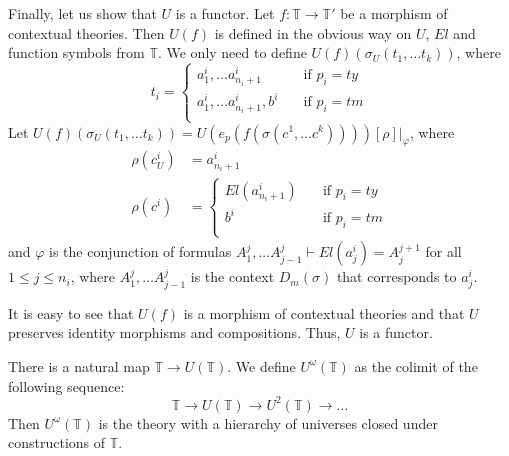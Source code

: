 \documentclass[reqno]{amsart}
\theoremstyle{definition}
\theoremstyle{remark}
\numberwithin{figure}{section}
\begin{document}
\begin{example}
Finally, let us show that $U$ is a functor.
Let $f : \mathbb{T} \to \mathbb{T}'$ be a morphism of contextual theories.
Then $U(f)$ is defined in the obvious way on $U$, $El$ and function symbols from $\mathbb{T}$.
We only need to define $U(f)(\sigma_U(t_1, \ldots t_k))$, where
\[ t_i =
  \begin{cases}
    a^i_1, \ldots a^i_{n_i+1}       & \quad \text{if } p_i = ty \\
    a^i_1, \ldots a^i_{n_i+1}, b^i  & \quad \text{if } p_i = tm \\
  \end{cases}
\]
Let $U(f)(\sigma_U(t_1, \ldots t_k)) = U(e_p(f(\sigma(c^1, \ldots c^k))))[\rho]|_\varphi$, where
\begin{align*}
\rho(c^i_U) & = a^i_{n_i+1} \\
\rho(c^i) & = 
  \begin{cases}
    El(a^i_{n_i+1})     & \quad \text{if } p_i = ty \\
    b^i                 & \quad \text{if } p_i = tm \\
  \end{cases}
\end{align*}
and $\varphi$ is the conjunction of formulas $A^j_1, \ldots A^j_{j-1} \vdash El(a^i_j) = A^{j+1}_j$ for all $1 \leq j \leq n_i$,
where $A^j_1, \ldots A^j_{j-1}$ is the context $D_m(\sigma)$ that corresponds to $a^i_j$.

It is easy to see that $U(f)$ is a morphism of contextual theories and that $U$ preserves identity morphisms and compositions.
Thus, $U$ is a functor.
\end{example}

\begin{example}
There is a natural map $\mathbb{T} \to U(\mathbb{T})$.
We define $U^\omega(\mathbb{T})$ as the colimit of the following sequence:
\[ \mathbb{T} \to U(\mathbb{T}) \to U^2(\mathbb{T}) \to \ldots \]
Then $U^\omega(\mathbb{T})$ is the theory with a hierarchy of universes closed under constructions of $\mathbb{T}$.
\end{example}



\end{document}
